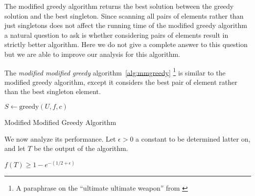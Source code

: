 The modified greedy algorithm returns the best solution between the greedy solution and the best singleton.
Since scanning all pairs of elements rather than just singletons does not affect the running time of the modified greedy algorithm a natural question to ask is whether considering pairs of elements result in strictly better algorithm.
Here we do not give a complete answer to this question but we are able to improve our analysis for this algorithm. 

The \emph{modified modified greedy} algorithm~\ref{alg:mmgreedy} 
\footnote{A paraphrase on the ``ultimate ultimate weapon'' from \cite{ninjago2017}}
is similar to the  modified greedy algorithm, 
except it considers the best pair of element rather than the best singleton element.


\begin{algorithm}[H]
\label{alg:mmgreedy}



$S \leftarrow \text{greedy}(U, f, c)$
\\
\caption{Modified Modified Greedy Algorithm}
\end{algorithm}

We now analyze its performance.
Let $\epsilon > 0$ a constant to be determined latter on, and let $T$ be the output of 
the algorithm.

\begin{theorem}
$f(T) \geq 1 - e^{-(1/2 + \epsilon)}$
\end{theorem}

